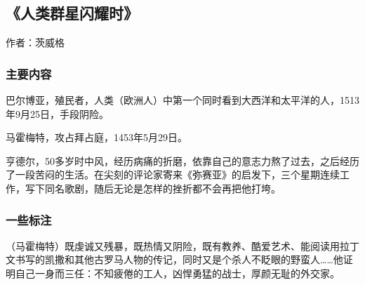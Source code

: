 \subsection{《人类群星闪耀时》}
作者：茨威格

\subsubsection{主要内容}
\begin{itemize*}
	\item 巴尔博亚，殖民者，人类（欧洲人）中第一个同时看到大西洋和太平洋的人，1513年9月25日，手段阴险。
	\item 马霍梅特，攻占拜占庭，1453年5月29日。
	\item 亨德尔，50多岁时中风，经历病痛的折磨，依靠自己的意志力熬了过去，之后经历了一段苦闷的生活。在尖刻的评论家寄来《弥赛亚》的启发下，三个星期连续工作，写下同名歌剧，随后无论是怎样的挫折都不会再把他打垮。
	
\end{itemize*}

\subsubsection{一些标注}

（马霍梅特）既虔诚又残暴，既热情又阴险，既有教养、酷爱艺术、能阅读用拉丁文书写的凯撒和其他古罗马人物的传记，同时又是个杀人不眨眼的野蛮人……他证明自己一身而三任：不知疲倦的工人，凶悍勇猛的战士，厚颜无耻的外交家。
